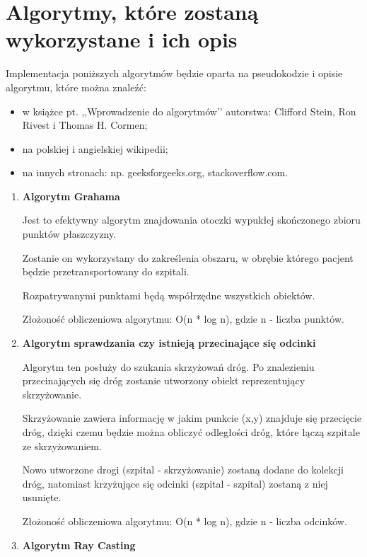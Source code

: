 \documentclass{article}
\begin{document}
\clearpage


\section{Algorytmy, które zostaną wykorzystane i ich opis}
{\fontsize{12}{12}\selectfont
Implementacja poniższych algorytmów będzie oparta na pseudokodzie i opisie algorytmu, które można znaleźć:
\begin{itemize}
    \item w książce pt. ,,Wprowadzenie do algorytmów’’ autorstwa: Clifford Stein, Ron Rivest i Thomas H. Cormen;
    \item na polskiej i angielskiej wikipedii;
    \item  na innych stronach: np. geeksforgeeks.org, stackoverflow.com.
\end{itemize}

\begin{enumerate}
    \item \textbf{Algorytm Grahama}
    
    Jest to efektywny algorytm znajdowania otoczki wypukłej skończonego zbioru punktów płaszczyzny. 

    Zostanie on wykorzystany do zakreślenia obszaru, w obrębie którego pacjent będzie przetransportowany do szpitali. 
    
    Rozpatrywanymi punktami będą współrzędne wszystkich obiektów.
    
    Złożoność obliczeniowa algorytmu: O(n * log n), gdzie n - liczba punktów.

    \item \textbf{Algorytm sprawdzania czy istnieją przecinające się odcinki}
    
    Algorytm ten posłuży do szukania skrzyżowań dróg. Po znalezieniu przecinających się dróg zostanie utworzony obiekt reprezentujący skrzyżowanie. 

    Skrzyżowanie zawiera informację w jakim punkcie (x,y) znajduje się przecięcie dróg, dzięki czemu będzie można obliczyć odległości dróg, które łączą szpitale ze skrzyżowaniem.
    
    Nowo utworzone drogi (szpital - skrzyżowanie) zostaną dodane do kolekcji dróg, natomiast krzyżujące się odcinki (szpital - szpital) zostaną z niej usunięte.
    
    Złożoność obliczeniowa algorytmu: O(n * log n), gdzie n - liczba odcinków.

    \item \textbf{Algorytm Ray Casting}
    

\end{enumerate}}
\end{document}
